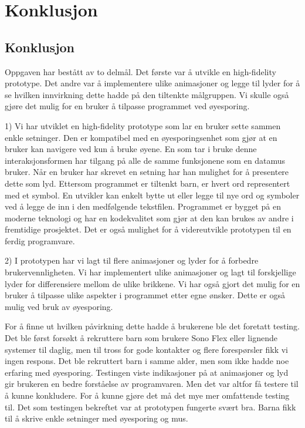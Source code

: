 \chapter{Konklusjon}

\section{Konklusjon}

Oppgaven har bestått av to delmål. Det første var å utvikle en high-fidelity prototype. Det andre var å implementere ulike animasjoner og legge til lyder for å se hvilken innvirkning dette hadde på den tiltenkte målgruppen. Vi skulle også gjøre det mulig for en bruker å  tilpasse programmet ved øyesporing. 

1) Vi har utviklet en high-fidelity prototype som lar en bruker sette sammen enkle setninger. Den er kompatibel med en øyesporingsenhet som gjør at en bruker kan navigere ved kun å bruke øyene. En som tar i bruke denne interaksjonsformen har tilgang på alle de samme funksjonene som en datamus bruker. Når en bruker har skrevet en setning har han mulighet for å presentere dette som lyd. Ettersom programmet er tiltenkt barn, er hvert ord representert med et symbol. En utvikler kan enkelt bytte ut eller legge til nye ord og symboler ved å legge de inn i den medfølgende tekstfilen. Programmet er bygget på en moderne teknologi og har en kodekvalitet som gjør at den kan brukes av andre i fremtidige prosjektet. Det er også mulighet for å videreutvikle prototypen til en ferdig programvare. 

2) I prototypen har vi lagt til flere animasjoner og lyder for å forbedre brukervennligheten. Vi har implementert ulike animasjoner og lagt til forskjellige lyder for differensiere mellom de ulike brikkene. Vi har også gjort det mulig for en bruker å tilpasse ulike aspekter i programmet etter egne ønsker. Dette er også mulig ved bruk av øyesporing. 


For å finne ut hvilken påvirkning dette hadde å brukerene ble det foretatt testing. Det ble først forsøkt å rekruttere barn som brukere Sono Flex eller lignende systemer til daglig, men til tross for gode kontakter og flere forespørsler fikk vi ingen respons. Det ble rekruttert barn i samme alder, men som ikke hadde noe erfaring med øyesporing. Testingen viste indikasjoner på at animasjoner og lyd gir brukeren en bedre forståelse av programvaren. Men det var altfor få testere til å kunne konkludere. For å kunne gjøre det må det mye mer omfattende testing til. Det som testingen bekreftet var at prototypen fungerte svært bra. Barna fikk til å skrive enkle setninger med øyesporing og mus.


